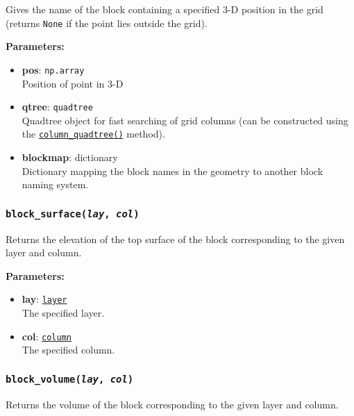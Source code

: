 Gives the name of the block containing a specified 3-D position in the grid (returns \texttt{None} if the point lies outside the grid).

\textbf{Parameters:}
\begin{itemize}
\item \textbf{pos}: \texttt{np.array}\\
  Position of point in 3-D
\item \textbf{qtree}: \texttt{quadtree}\\
  Quadtree object for fast searching of grid columns (can be constructed using the \hyperref[sec:mulgrid:column_quadtree]{\texttt{column\_quadtree()}} method).
\item \textbf{blockmap}: dictionary\\
  Dictionary mapping the block names in the geometry to another block naming system.
\end{itemize}

\begin{snugshade}\subsubsection{\texttt{block\_surface(\emph{lay}, \emph{col})}}\end{snugshade}
\label{sec:mulgrid:block_surface}

Returns the elevation of the top surface of the block corresponding to the given layer and column.

\textbf{Parameters:}
\begin{itemize}
\item \textbf{lay}: \hyperref[layerobjects]{\texttt{layer}}\\
  The specified layer.
\item \textbf{col}: \hyperref[columnobjects]{\texttt{column}}\\
  The specified column.
\end{itemize}

\begin{snugshade}\subsubsection{\texttt{block\_volume(\emph{lay}, \emph{col})}}\end{snugshade}
\label{sec:mulgrid:block_volume}

Returns the volume of the block corresponding to the given layer and column.

